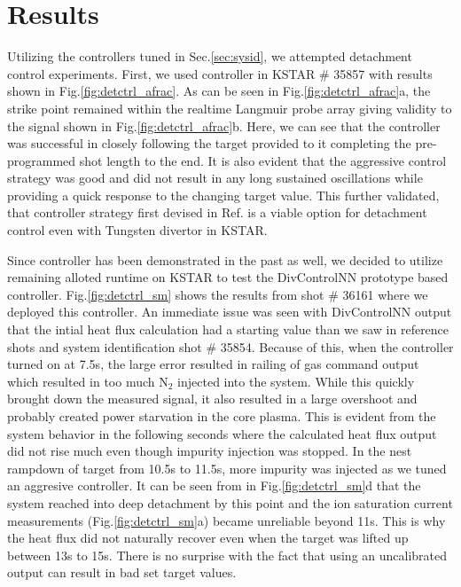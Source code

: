 \section{Results}
\label{sec:results}





Utilizing the controllers tuned in Sec.\ref{sec:sysid}, we attempted detachment control experiments.
First, we used \Afrac controller in KSTAR \# 35857 with results shown in Fig.\ref{fig:detctrl_afrac}.
As can be seen in Fig.\ref{fig:detctrl_afrac}a, the strike point remained within the realtime Langmuir probe array giving validity to the \Afrac signal shown in Fig.\ref{fig:detctrl_afrac}b.
Here, we can see that the controller was successful in closely following the target provided to it completing the pre-programmed shot length to the end.
It is also evident that the aggressive control strategy was good and did not result in any long sustained oscillations while providing a quick response to the changing target value.
This further validated, that \Afrac controller strategy first devised in Ref.\cite{Eldon_2022_PPCF} is a viable option for detachment control even with Tungsten divertor in KSTAR.

Since \Afrac controller has been demonstrated in the past as well, we decided to utilize remaining alloted runtime on KSTAR to test the DivControlNN prototype based controller.
Fig.\ref{fig:detctrl_sm} shows the results from shot \# 36161 where we deployed this controller.
An immediate issue was seen with DivControlNN output that the intial heat flux calculation had a starting value than we saw in reference shots and system identification shot \# 35854.
Because of this, when the controller turned on at 7.5s, the large error resulted in railing of gas command output which resulted in too much N$_2$ injected into the system.
While this quickly brought down the measured signal, it also resulted in a large overshoot and probably created power starvation in the core plasma.
This is evident from the system behavior in the following seconds where the calculated heat flux output did not rise much even though impurity injection was stopped.
In the nest rampdown of target from 10.5s to 11.5s, more impurity was injected as we tuned an aggresive controller.
It can be seen from \Afrac in Fig.\ref{fig:detctrl_sm}d that the system reached into deep detachment by this point and the ion saturation current measurements (Fig.\ref{fig:detctrl_sm}a) became unreliable beyond 11s.
This is why the heat flux did not naturally recover even when the target was lifted up between 13s to 15s.
There is no surprise with the fact that using an uncalibrated output can result in bad set target values.


